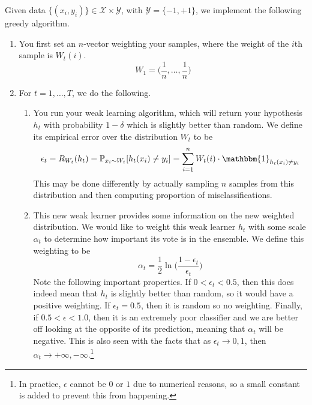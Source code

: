 \documentclass{article}
\begin{document}
    Given data $\{(x_i, y_i)\} \in \mathcal{X} \times \mathcal{Y}$, with $\mathcal{Y} = \{-1, +1\}$, we implement the following greedy algorithm. 
    \begin{enumerate}
      \item You first set an $n$-vector weighting your samples, where the weight of the $i$th sample is $W_t (i)$. 
        \begin{equation}
          W_1 = \big( \frac{1}{n}, \ldots, \frac{1}{n} \big)
        \end{equation}

      \item For $t = 1, \ldots, T$, we do the following. 
        \begin{enumerate}
          \item You run your weak learning algorithm, which will return your hypothesis $h_t$ with probability $1 - \delta$ which is slightly better than random. We define its empirical error over the distribution $W_t$ to be 
            \begin{equation}
              \epsilon_t = R_{W_t} (h_t) = \mathbb{P}_{x_i \sim W_t} [ h_t (x_i) \neq y_i] = \sum_{i=1}^n W_t (i) \cdot \mathbbm{1}_{h_t (x_i) \neq y_i}
            \end{equation}
            This may be done differently by actually sampling $n$ samples from this distribution and then computing proportion of misclassifications. 

          \item This new weak learner provides some information on the new weighted distribution. We would like to weight this weak learner $h_t$ with some scale $\alpha_t$ to determine how important its vote is in the ensemble. We define this weighting to be 
            \begin{equation}
              \alpha_t = \frac{1}{2} \ln \bigg( \frac{1 - \epsilon_t}{\epsilon_t} \bigg)
            \end{equation}
          Note the following important properties. If $0 < \epsilon_t < 0.5$, then this does indeed mean that $h_t$ is slightly better than random, so it would have a positive weighting. If $\epsilon_t = 0.5$, then it is random so no weighting. Finally, if $0.5 < \epsilon < 1.0$, then it is an extremely poor classifier and we are better off looking at the opposite of its prediction, meaning that $\alpha_t$ will be negative.
          This is also seen with the facts that as $\epsilon_t \rightarrow 0, 1$, then $\alpha_t \rightarrow +\infty, -\infty$.\footnote{In practice, $\epsilon$ cannot be $0$ or $1$ due to numerical reasons, so a small constant is added to prevent this from happening.} 


\end{enumerate}
\end{enumerate}
\end{document}
